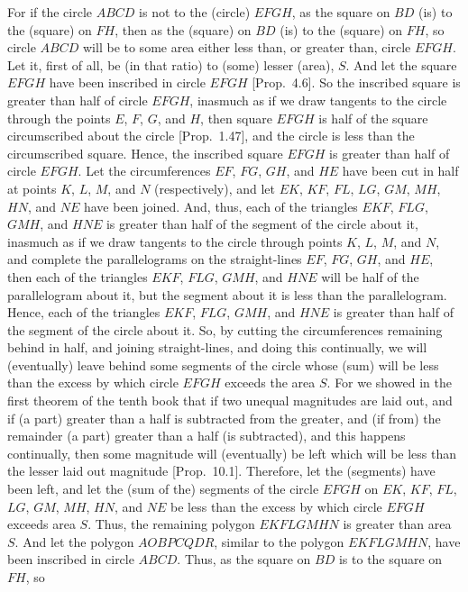 For if the circle $ABCD$ is not to the (circle) $EFGH$, as the square on
$BD$ (is) to the (square) on $FH$, then  as the (square) on $BD$ (is) to
the (square) on $FH$, so circle $ABCD$ will be to some area either less than, or greater
than, circle $EFGH$. Let it, first of all, be (in that ratio) to (some) lesser (area), $S$.
And let the square $EFGH$ have been inscribed in circle $EFGH$ [Prop.~4.6]. So the inscribed
square is greater than half of circle $EFGH$, inasmuch as if we draw tangents to the circle through the points $E$, $F$, $G$, and $H$,
then square $EFGH$ is half of the square circumscribed about the circle [Prop.~1.47], and the circle is less than the
circumscribed square. Hence, the inscribed square $EFGH$ is greater than
half of circle $EFGH$. Let the circumferences $EF$, $FG$, $GH$,
and $HE$ have been cut in half at points $K$, $L$, $M$, and $N$ (respectively), and let $EK$, $KF$, $FL$, $LG$, $GM$, $MH$, $HN$,
and $NE$ have been joined. And, thus, each of the triangles
$EKF$, $FLG$, $GMH$, and $HNE$ is greater than half of the
segment of the circle about it, inasmuch as if we draw tangents to the circle through points $K$, $L$, $M$, and $N$, and complete the parallelograms on the straight-lines $EF$, $FG$, $GH$, and $HE$, then
each of the triangles $EKF$, $FLG$, $GMH$, and $HNE$ will be
half of the parallelogram about it, but the segment about
it is less than the parallelogram. Hence, each of the triangles $EKF$, 
$FLG$, $GMH$, and $HNE$ is greater than half of the segment of
the circle about it. So, by cutting the  circumferences remaining behind in half,
and joining straight-lines, and doing this continually, we will
(eventually) leave behind some segments of the circle whose (sum) will be
less than the excess by which circle $EFGH$ exceeds the area $S$.
For we showed in the first theorem of the tenth book that if two unequal
magnitudes are laid out, and if (a part) greater than a half is subtracted
from the greater, and (if from) the remainder (a part) greater than a
half (is subtracted), and this happens continually, then some magnitude
will (eventually) be left which will be less than the lesser laid out magnitude [Prop.~10.1]. Therefore, let the (segments) have been left, and let 
 the (sum of the) segments of the circle $EFGH$ on $EK$, $KF$, $FL$, $LG$, $GM$, $MH$, $HN$, and $NE$ be less than the excess by which  circle
 $EFGH$ exceeds  area $S$. Thus, the remaining polygon $EKFLGMHN$ is greater than area $S$. 
 And let the polygon $AOBPCQDR$,
 similar to the polygon $EKFLGMHN$, have been inscribed in circle
 $ABCD$. Thus, as the square on $BD$ is to the square on $FH$, so
